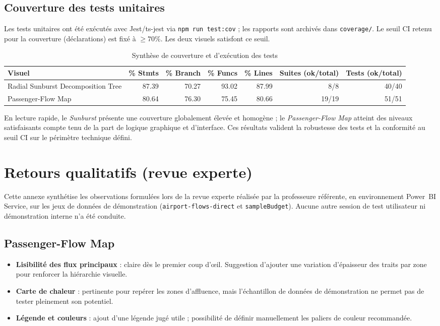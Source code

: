 \subsection{Couverture des tests unitaires}
\label{ann:a3-tests-coverage}

Les tests unitaires ont été exécutés avec Jest/ts-jest via \texttt{npm run test:cov} ; 
les rapports sont archivés dans \texttt{coverage/}.  
Le seuil CI retenu pour la couverture (déclarations) est fixé à \(\geq 70\%\). 
Les deux visuels satisfont ce seuil.

\begin{table}[H]\centering\small
\caption{Synthèse de couverture et d'exécution des tests}
\begin{tabular}{lrrrrrr}
\toprule
Visuel & \% Stmts & \% Branch & \% Funcs & \% Lines & Suites (ok/total) & Tests (ok/total) \\
\midrule
Radial Sunburst Decomposition Tree & 87.39 & 70.27 & 93.02 & 87.99 & 8/8  & 40/40 \\
Passenger-Flow Map                 & 80.64 & 76.30 & 75.45 & 80.66 & 19/19 & 51/51 \\
\bottomrule
\end{tabular}
\end{table}

En lecture rapide, le \textit{Sunburst} présente une couverture globalement élevée et homogène ; 
le \textit{Passenger-Flow Map} atteint des niveaux satisfaisants compte tenu de la part de logique graphique et d’interface.  
Ces résultats valident la robustesse des tests et la conformité au seuil CI sur le périmètre technique défini.

\section{Retours qualitatifs (revue experte)}
\label{ann:a4-retours}

Cette annexe synthétise les observations formulées lors de la revue experte réalisée 
par la professeure référente, en environnement Power~BI Service, 
sur les jeux de données de démonstration (\texttt{airport-flows-direct} et \texttt{sampleBudget}). 
Aucune autre session de test utilisateur ni démonstration interne n’a été conduite.

\subsection{Passenger-Flow Map}
\begin{itemize}[nosep]
  \item \textbf{Lisibilité des flux principaux} : claire dès le premier coup d’œil. Suggestion d’ajouter une variation d’épaisseur des traits par zone pour renforcer la hiérarchie visuelle.
  \item \textbf{Carte de chaleur} : pertinente pour repérer les zones d’affluence, mais l’échantillon de données de démonstration ne permet pas de tester pleinement son potentiel.
  \item \textbf{Légende et couleurs} : ajout d’une légende jugé utile ; possibilité de définir manuellement les paliers de couleur recommandée.
\end{itemize}

